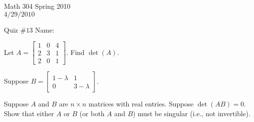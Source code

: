 \documentclass[10pt]{exam}
\begin{document}
Math 304 Spring 2010 \\
$4/29/2010$

Quiz $\#13$ \hspace{1.9in} {Name:} {\underline {\hspace{2.5in}}}
\vspace{.5pc}

\begin{center}
\end{center}

\begin{questions}

\question Let $A=\left[\begin{array}{rrr} 1 & 0 & 4 \\ 2 & 3 &1\\ 2 & 0 & 1 \end{array}\right]$.  Find $\det(A)$.
\vfill

\question Suppose $B=\left[\begin{array}{cc} 1-\lambda & 1 \\ 0 & 3-\lambda\end{array}\right]$.

\question Suppose $A$ and $B$ are $n\times n$ matrices with real entries.  Suppose $\det(AB)=0$.  Show that either $A$ or $B$ (or both $A$ and $B$) must be singular (i.e., not invertible).
\vfill

\end{questions}
\end{document}
